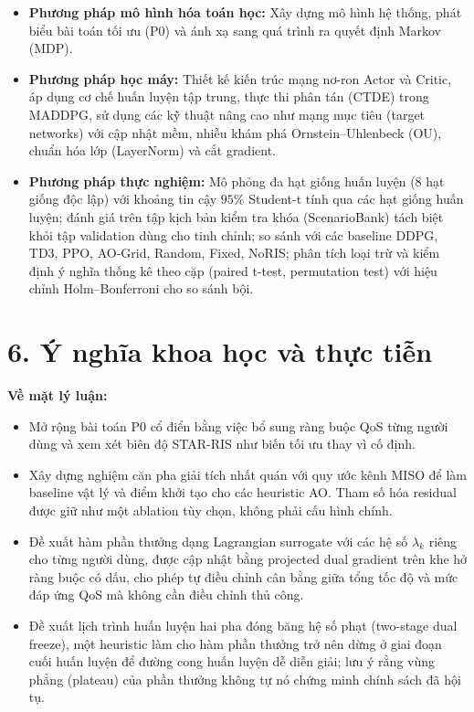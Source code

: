 \begin{itemize}[leftmargin=*]
\item \textbf{Phương pháp mô hình hóa toán học:} Xây dựng mô hình hệ thống,
phát biểu bài toán tối ưu (P0) và ánh xạ sang quá trình ra quyết định
Markov (MDP).
\item \textbf{Phương pháp học máy:} Thiết kế kiến trúc mạng nơ-ron Actor và
Critic, áp dụng cơ chế huấn luyện tập trung, thực thi phân tán (CTDE)
trong MADDPG, sử dụng các kỹ thuật nâng cao như mạng mục tiêu (target
networks) với cập nhật mềm, nhiễu khám phá Ornstein--Uhlenbeck (OU),
chuẩn hóa lớp (LayerNorm) và cắt gradient.
\item \textbf{Phương pháp thực nghiệm:} Mô phỏng đa hạt giống huấn luyện
(8 hạt giống độc lập) với khoảng tin cậy $95\%$ Student-t tính qua các
hạt giống huấn luyện; đánh giá trên tập kịch bản kiểm tra khóa
(ScenarioBank) tách biệt khỏi tập validation dùng cho tinh chỉnh; so
sánh với các baseline DDPG, TD3, PPO, AO-Grid, Random, Fixed, NoRIS;
phân tích loại trừ và kiểm định ý nghĩa thống kê theo cặp (paired
t-test, permutation test) với hiệu chỉnh Holm--Bonferroni cho so sánh
bội.
\end{itemize}

\section*{6. Ý nghĩa khoa học và thực tiễn}

\noindent\textbf{Về mặt lý luận:}
\begin{itemize}[leftmargin=*]
\item Mở rộng bài toán P0 cổ điển bằng việc bổ sung ràng buộc QoS từng
người dùng và xem xét biên độ STAR-RIS như biến tối ưu thay vì cố định.
\item Xây dựng nghiệm căn pha giải tích nhất quán với quy ước kênh MISO để
làm baseline vật lý và điểm khởi tạo cho các heuristic AO. Tham số hóa
residual được giữ như một ablation tùy chọn, không phải cấu hình chính.
\item Đề xuất hàm phần thưởng dạng Lagrangian surrogate với các hệ số
$\lambda_k$ riêng cho từng người dùng, được cập nhật bằng projected dual
gradient trên khe hở ràng buộc có dấu, cho phép tự điều chỉnh cân bằng
giữa tổng tốc độ và mức đáp ứng QoS mà không cần điều chỉnh thủ công.
\item Đề xuất lịch trình huấn luyện hai pha đóng băng hệ số phạt
(two-stage dual freeze), một heuristic làm cho hàm phần thưởng trở nên
dừng ở giai đoạn cuối huấn luyện để đường cong huấn luyện dễ diễn giải;
lưu ý rằng vùng phẳng (plateau) của phần thưởng không tự nó chứng minh
chính sách đã hội tụ.
\end{itemize}

